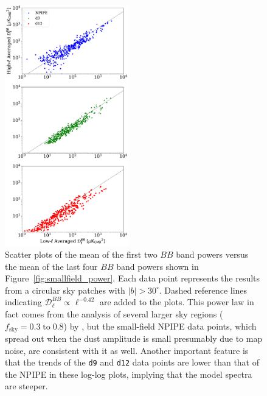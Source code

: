 \documentclass[twocolumn]{aastex631}
\begin{document}
\begin{figure}
    \centering
    \includegraphics[width=0.48\textwidth]{figures/all2_lhmean.pdf}
    \caption{Scatter plots of the mean of the first two $BB$ band powers versus the mean of the last four $BB$ band powers shown in Figure~\ref{fig:smallfield_power}. Each data point represents the results from a circular sky patches with $|b| > 30^\circ$. Dashed reference lines indicating $\mathcal{D}_\ell^{BB} \propto \ell^{-0.42}$ are added to the plots. This power law in fact comes from the analysis of several larger sky regions ($f_\text{sky} = 0.3 \; \text{to} \; 0.8$) by \cite{planck2014-XXX}, but the small-field NPIPE data points, which spread out when the dust amplitude is small presumably due to map noise, are consistent with it as well. Another important feature is that the trends of the \texttt{d9} and \texttt{d12} data points are lower than that of the NPIPE in these log-log plots, implying that the model spectra are steeper.}
    \label{fig:smallfield_power_all}
\end{figure}
\end{document}
